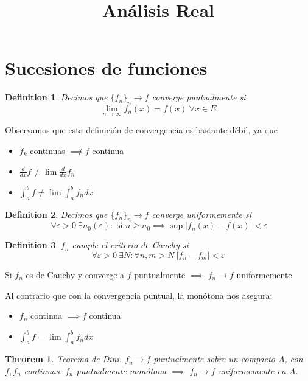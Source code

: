 \documentclass[leqno]{article}
\title{Análisis Real}
\date{}
\newtheorem*{definition}{Definition}
\newtheorem*{theorem}{Theorem}
\newcommand{\fn}{\{f_n\}_n}
\begin{document}
\maketitle
\tableofcontents
\newpage

\section{Sucesiones de funciones}
\begin{definition}
  Decimos que $\fn \to f$ converge puntualmente si
  \[
	\lim_{n \to \infty} f_n(x) = f(x) \ \forall x \in E 
  \]
\end{definition}
Observamos que esta definición de convergencia es bastante débil, ya que
\begin{itemize}[topsep=0pt, itemsep=0pt]
  \item $f_k$ continuas  $\not\implies f$ continua \\
  \item $\displaystyle\frac{d}{dx} f \neq  \lim \frac{d}{dx} f_n$ 
  \item $\displaystyle\int_a^b f \neq  \lim \int_a^b f_n dx$
\end{itemize}

\begin{definition}
  Decimos que $\fn \to f$ converge uniformemente si
\[
\ \forall \varepsilon > 0 \ \exists n_0(\varepsilon) : \text{ si } n\ge n_0 \implies \sup  | f_n(x)-f(x)|<\varepsilon
\] 
\end{definition}

\begin{definition}
$f_n$ cumple el criterio de Cauchy si
 \[
\forall \varepsilon >0 \ \exists N : \forall n, m>N \ |f_n-f_m | <\varepsilon 
\] 
\end{definition}

Si $f_n$ es de Cauchy y converge a  $f$ puntualmente  $\implies$ $f_n \to f$ uniformemente

Al contrario que con la convergencia puntual, la monótona nos asegura:
\begin{itemize}[topsep=0pt, itemsep=0pt]
  \item $f_n$ continua  $\implies f$ continua
  \item $\displaystyle\int_a^b f =  \lim \int_a^b f_n dx$
\end{itemize}


\begin{theorem}
Teorema de Dini. $f_n \to f$ puntualmente sobre un compacto  $A$, con $f, f_n$ continuas. $f_n$ puntualmente monótona  $\implies$ $f_n\to f $ uniformemente en $A$.
\end{theorem}
\end{document}
